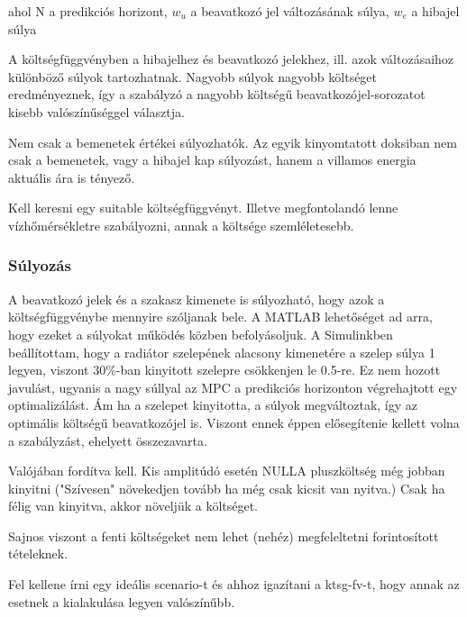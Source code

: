 ahol N a predikciós horizont, $w_u$ a beavatkozó jel változásának súlya, $w_e$ a hibajel súlya

A költségfüggvényben a hibajelhez és beavatkozó jelekhez, ill. azok változásaihoz különböző súlyok tartozhatnak.
Nagyobb súlyok nagyobb költséget eredményeznek, így a szabályzó a nagyobb költségű beavatkozójel-sorozatot kisebb valószínűséggel választja.






Nem csak a bemenetek értékei súlyozhatók. Az egyik kinyomtatott doksiban nem csak a bemenetek, vagy a hibajel kap súlyozást, hanem a villamos energia aktuális ára is tényező.

Kell keresni egy suitable költségfüggvényt. Illetve megfontolandó lenne vízhőmérsékletre szabályozni, annak a költsége szemléletesebb.

\subsubsection{Súlyozás}
A beavatkozó jelek és a szakasz kimenete is súlyozható, hogy azok a költségfüggvénybe mennyire szóljanak bele. A MATLAB lehetőséget ad arra, hogy ezeket a súlyokat működés közben befolyásoljuk. A Simulinkben beállítottam, hogy a radiátor szelepének alacsony kimenetére a szelep súlya 1 legyen, viszont 30\%-ban kinyitott szelepre csökkenjen le 0.5-re. Ez nem hozott javulást, ugyanis a nagy súllyal az MPC a predikciós horizonton végrehajtott egy optimalizálást. Ám ha a szelepet kinyitotta, a súlyok megváltoztak, így az optimális költségű beavatkozójel is. Viszont ennek éppen elősegítenie kellett volna a szabályzást, ehelyett összezavarta.


Valójában fordítva kell. Kis amplitúdó esetén NULLA pluszköltség még jobban kinyitni ("Szívesen" növekedjen tovább ha még csak kicsit van nyitva.) Csak ha félig van kinyitva, akkor növeljük a költséget.

Sajnos viszont a fenti költségeket nem lehet (nehéz) megfeleltetni forintosított tételeknek.

Fel kellene írni egy ideális scenario-t és ahhoz igazítani a ktsg-fv-t, hogy annak az esetnek a kialakulása legyen valószínűbb.

%
%
%


